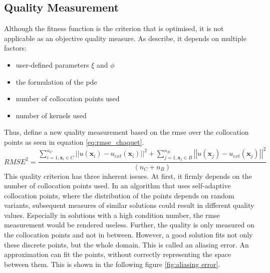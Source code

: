 \documentclass[./\jobname.tex]{subfiles}
\begin{document}
\subsection{Quality Measurement}
\label{chap:metric_quality}
Although the fitness function is the criterion that is optimised, it is not applicable as an objective quality measure. As \cite{chaquet_using_2019} describe, it depends on multiple factors:
\begin{itemize}
	\item user-defined parameters $\xi$ and $\phi$ 
	\item the formulation of the \gls{pde} 
	\item number of collocation points used 
	\item number of kernels used
\end{itemize}
Thus, \cite{chaquet_using_2019} define a new quality measurement based on the \gls{rmse} over the collocation points as seen in equation \eqref{eq:rmse_chaquet}. 
\begin{equation}
\label{eq:rmse_chaquet}
RMSE^2 = \frac{\sum_{i=1, \mathbf{x}_i \in C}^{n_C} \left|\left| u(\mathbf{x}_i) - u_{ext}(\mathbf{x}_i) \right|\right|^2 + \sum_{j=1, \mathbf{x}_j \in B}^{n_B} \left|\left| u(\mathbf{x}_j) - u_{ext}(\mathbf{x}_j) \right|\right|^2}{(n_C + n_B)}
\end{equation}
This quality criterion has three inherent issues. At first, it firmly depends on the number of collocation points used. In an algorithm that uses self-adaptive collocation points, where the distribution of the points depends on random variants, subsequent measures of similar solutions could result in different quality values. Especially in solutions with a high condition number, the \gls{rmse} measurement would be rendered useless. Further, the quality is only measured on the collocation points and not in between. However, a good solution fits not only these discrete points, but the whole domain. This is called an aliasing error. An approximation can fit the points, without correctly representing the space between them. This is shown in the following figure \ref{fig:aliasing error}.
\end{document}
